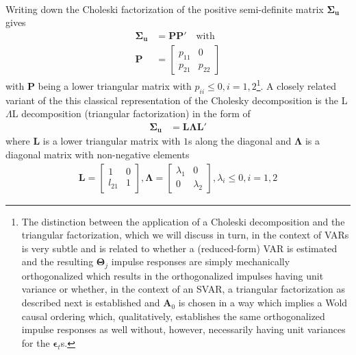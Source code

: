 \documentclass[a4paper,11pt,listof=nochaptergap,oneside,pointednumbers,bibtotoc,bigheadings,liststotoc]{scrbook}
\theoremstyle{mysatz}
\theoremstyle{mydefinition}
\theoremstyle{mybemerkung}
\newcommand{\vect}[1]{\boldsymbol{\mathbf{#1}}}
\begin{document}
\\
Writing down the Choleski factorization of the positive semi-definite matrix $\vect{\Sigma_u}$ gives
\begin{equation} \label{eq:svar14}
\begin{split}
 		\vect{\Sigma_u} & = \vect{P}\vect{P'} \quad \text{with} \\
		\vect{P} & = \begin{bmatrix}
    							p_{11} & 0 \\
							p_{21} & p_{22}
 							\end{bmatrix}
\end{split}								
\end{equation}
with $\vect{P}$ being a lower triangular matrix with $p_{ii} \leq 0, i = 1, 2$\footnote{The distinction between the application of a Choleski decomposition and the triangular factorization, which we will discuss in turn, in the context of VARs is very subtle and is related to whether a (reduced-form) VAR is estimated and the resulting $\vect{\Theta}_j$ impulse responses are simply mechanically orthogonalized which results in the orthogonalized impulses having unit variance or whether, in the context of an SVAR, a triangular factorization as described next is established and $\vect{A}_0$ is chosen in a way which implies a Wold causal ordering which, qualitatively, establishes the same orthogonalized impulse responses as well without, however, necessarily having unit variances for the $\vect{\epsilon}_t$s.}. A closely related variant of the this classical representation of the Cholesky decomposition is the L$\Lambda$L decomposition (triangular factorization) in the form of 
\begin{equation} \label{eq:svar15}
\begin{split}
 		\vect{\Sigma_u} & = \vect{L}\vect{\Lambda}\vect{L'}
\end{split}								
\end{equation}
where $\vect{L}$ is a lower triangular matrix with $1$s along the diagonal and $\vect{\Lambda}$ is a diagonal matrix with non-negative elements
\begin{equation} \label{eq:svar16}
\begin{split}
	\vect{L} =  \begin{bmatrix}
    				1 & 0 \\
				l_{21} & 1 
 				\end{bmatrix}, 
				\vect{\Lambda} = 
					\begin{bmatrix}
    					\lambda_1 & 0 \\
					0 & \lambda_2 
 					\end{bmatrix},
					\lambda_i \leq 0, i = 1, 2
\end{split}								
\end{equation}
\end{document}
